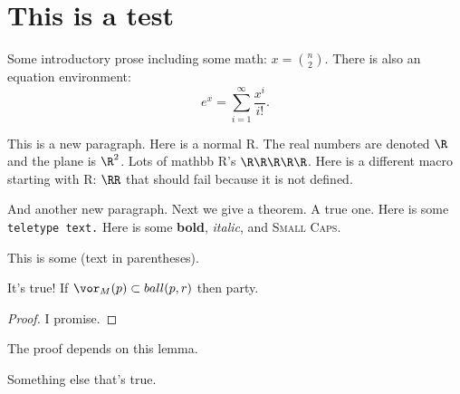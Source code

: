 \section{This is a test} %
\label{sec:this_is_a_test}

Some introductory prose including some math: $x = {n \choose 2}$.
There is also an equation environment:
\[
  e^x = \sum_{i=1}^\infty \frac{x^i}{i!}.
\]

This is a new paragraph. Here is a normal R.
The real numbers are denoted $\R$ and the plane is $\R^2$. Lots of mathbb R's $\R\R\R\R\R$.
Here is a different macro starting with R: $\RR$ that should fail because it is not defined.

And another new paragraph.
Next we give a theorem.  A true one.
Here is some \texttt{teletype text.}
Here is some \textbf{bold}, \emph{italic}, and \textsc{Small Caps}.

This is some (text in parentheses).

  \begin{theorem}\label{thm:true_theorem}
    It's true!  If $\vor_M(p) \subset ball(p,r)$ then party.
  \end{theorem}
  \begin{proof}
    I promise.
  \end{proof}

  The proof depends on this lemma.
  
  \begin{lemma}\label{lem:necessary}
    Something else that's true.
  \end{lemma}


